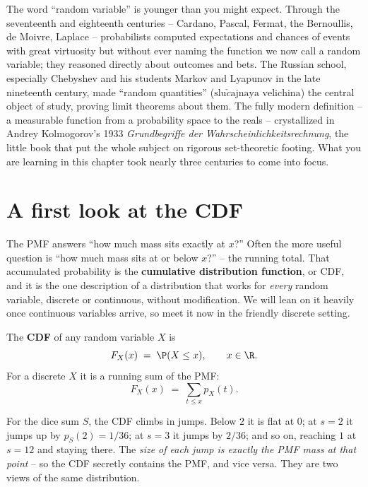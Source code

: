 \begin{historybox}
The word ``random variable'' is younger than you might expect. Through the seventeenth
and eighteenth centuries -- Cardano, Pascal, Fermat, the Bernoullis, de Moivre,
Laplace -- probabilists computed expectations and chances of events with great virtuosity
but without ever naming the function we now call a random variable; they reasoned
directly about outcomes and bets. The Russian school, especially Chebyshev and his
students Markov and Lyapunov in the late nineteenth century, made ``random quantities''
($\text{slu}\check{c}\text{ajnaya velichina}$) the central object of study, proving
limit theorems about them. The fully modern definition -- a measurable function from a
probability space to the reals -- crystallized in Andrey Kolmogorov's 1933
\emph{Grundbegriffe der Wahrscheinlichkeitsrechnung}, the little book that put the
whole subject on rigorous set-theoretic footing. What you are learning in this chapter
took nearly three centuries to come into focus.
\end{historybox}

\section{A first look at the CDF}
\label{ch06:cdf}

The PMF answers ``how much mass sits exactly at $x$?'' Often the more useful question
is ``how much mass sits at or below $x$?'' -- the running total. That accumulated
probability is the \textbf{cumulative distribution function}, or CDF, and it is the one
description of a distribution that works for \emph{every} random variable, discrete or
continuous, without modification. We will lean on it heavily once continuous variables
arrive, so meet it now in the friendly discrete setting.

\begin{definition}
\label{ch06:def-cdf}
The \textbf{CDF} of any random variable $X$ is
\[
  F_X(x) \;=\; \P(X \le x), \qquad x \in \R.
\]
For a discrete $X$ it is a running sum of the PMF:
\[
  F_X(x) \;=\; \sum_{t \le x} p_X(t).
\]
\end{definition}

For the dice sum $S$, the CDF climbs in jumps. Below $2$ it is flat at $0$; at $s=2$ it
jumps up by $p_S(2) = 1/36$; at $s=3$ it jumps by $2/36$; and so on, reaching $1$ at
$s=12$ and staying there. The \emph{size of each jump is exactly the PMF mass at that
point} -- so the CDF secretly contains the PMF, and vice versa. They are two views of
the same distribution.

